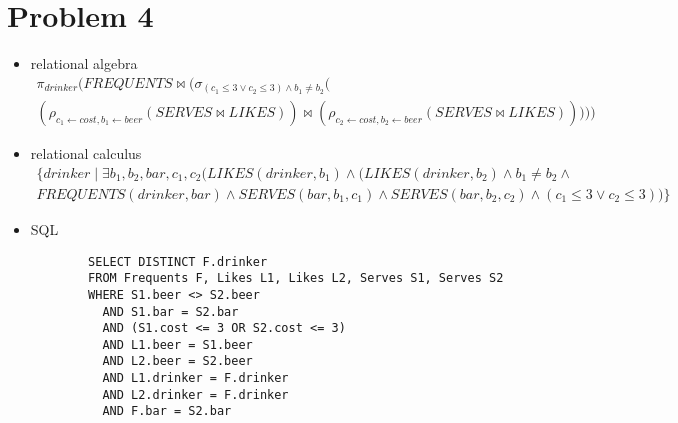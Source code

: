 \documentclass[a4paper]{article}
\begin{document}
\section*{Problem 4}
\begin{itemize}
        \item relational algebra
        \begin{gather*}
        \pi_{drinker}(FREQUENTS \bowtie (\sigma_{(c_1 \leq 3 \lor c_2 \leq 3) \land b_1 \not= b_2}( \\
        (\rho_{c_1 \gets cost, b_1 \gets beer} (SERVES \bowtie LIKES))
        \bowtie (\rho_{c_2 \gets cost, b_2 \gets beer} (SERVES \bowtie LIKES)))))
        \end{gather*}
        \item relational calculus
        \begin{gather*}
        \{ drinker \mid \exists b_1, b_2, bar, c_1, c_2(LIKES(drinker, b_1) \land (LIKES(drinker, b_2) \land b_1 \not= b_2 \land \\
        FREQUENTS(drinker, bar) \land SERVES(bar, b_1, c_1) \land SERVES(bar, b_2, c_2) \land (c_1 \leq 3 \lor c_2 \leq 3)) \}
        \end{gather*}
        \item SQL
        \begin{lstlisting}
        SELECT DISTINCT F.drinker
        FROM Frequents F, Likes L1, Likes L2, Serves S1, Serves S2
        WHERE S1.beer <> S2.beer
          AND S1.bar = S2.bar
          AND (S1.cost <= 3 OR S2.cost <= 3)
          AND L1.beer = S1.beer
          AND L2.beer = S2.beer
          AND L1.drinker = F.drinker
          AND L2.drinker = F.drinker
          AND F.bar = S2.bar
        \end{lstlisting}
\end{itemize}
\end{document}
